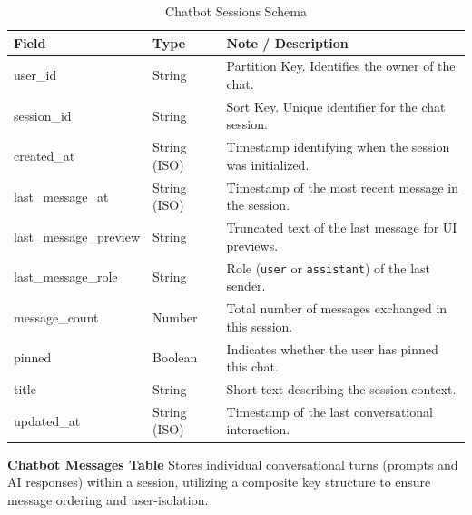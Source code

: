 \begin{table}[H]
    \centering
    \begin{tabular}{llp{8cm}}
        \toprule
        \textbf{Field} & \textbf{Type} & \textbf{Note / Description} \\
        \midrule
        user\_id & String & Partition Key. Identifies the owner of the chat. \\
        session\_id & String & Sort Key. Unique identifier for the chat session. \\
        \midrule
        created\_at & String (ISO) & Timestamp identifying when the session was initialized. \\
        last\_message\_at & String (ISO) & Timestamp of the most recent message in the session. \\
        last\_message\_preview & String & Truncated text of the last message for UI previews. \\
        last\_message\_role & String & Role (\texttt{user} or \texttt{assistant}) of the last sender. \\
        message\_count & Number & Total number of messages exchanged in this session. \\
        pinned & Boolean & Indicates whether the user has pinned this chat. \\
        title & String & Short text describing the session context. \\
        updated\_at & String (ISO) & Timestamp of the last conversational interaction. \\
        \bottomrule
    \end{tabular}
    \caption{Chatbot Sessions Schema}
    \label{tab:chat_sessions}
\end{table}

\newpage

\textbf{Chatbot Messages Table}
Stores individual conversational turns (prompts and AI responses) within a session, utilizing a composite key structure to ensure message ordering and user-isolation.

